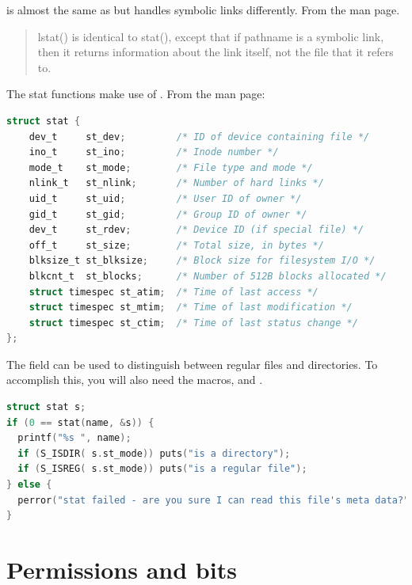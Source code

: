  is almost the same as  but handles symbolic links differently.
From the  man page.

\begin{quote}
    lstat() is identical to stat(), except that if pathname is a symbolic link, then it returns information about the link itself, not the file that it refers to.
\end{quote}

The stat functions make use of .
From the  man page:

\begin{lstlisting}[language=C]
struct stat {
    dev_t     st_dev;         /* ID of device containing file */
    ino_t     st_ino;         /* Inode number */
    mode_t    st_mode;        /* File type and mode */
    nlink_t   st_nlink;       /* Number of hard links */
    uid_t     st_uid;         /* User ID of owner */
    gid_t     st_gid;         /* Group ID of owner */
    dev_t     st_rdev;        /* Device ID (if special file) */
    off_t     st_size;        /* Total size, in bytes */
    blksize_t st_blksize;     /* Block size for filesystem I/O */
    blkcnt_t  st_blocks;      /* Number of 512B blocks allocated */
    struct timespec st_atim;  /* Time of last access */
    struct timespec st_mtim;  /* Time of last modification */
    struct timespec st_ctim;  /* Time of last status change */
};
\end{lstlisting}

The  field can be used to distinguish between regular files and directories.
To accomplish this, you will also need the macros,  and .

\begin{lstlisting}[language=C]
struct stat s;
if (0 == stat(name, &s)) {
  printf("%s ", name);
  if (S_ISDIR( s.st_mode)) puts("is a directory");
  if (S_ISREG( s.st_mode)) puts("is a regular file");
} else {
  perror("stat failed - are you sure I can read this file's meta data?");
}
\end{lstlisting}

\section{Permissions and bits}

